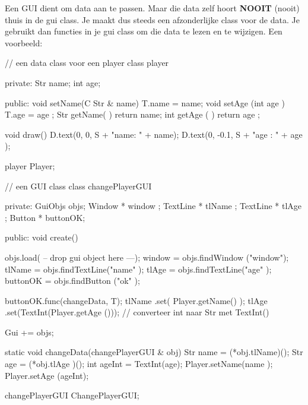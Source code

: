 Een GUI dient om data aan te passen. Maar die data zelf hoort \textbf{NOOIT} (nooit) thuis in de gui class. Je maakt dus steeds een afzonderlijke class voor de data. Je gebruikt dan functies in je gui class om die data te lezen en te wijzigen. Een voorbeeld:

\begin{code}
// een data class voor een player
class player {
private:
   Str name;
	 int age;

public:
   void setName(C Str & name) { T.name = name; }
	 void setAge (int     age ) { T.age  = age ; }
	 Str  getName(            ) { return   name; }
	 int  getAge (            ) { return   age ; }
	
	 void draw() {
	    D.text(0,    0, S + "name: " + name);
			D.text(0, -0.1, S + "age : " + age );
	 }
}
player Player;
\end{code}

\begin{code}
// een GUI class
class changePlayerGUI {
private:
   GuiObjs objs;
	 Window   * window  ;
	 TextLine * tlName  ;
	 TextLine * tlAge   ;
	 Button   * buttonOK;
	
public:
   void create() {
	    objs.load( -- drop gui object here ---);
			window   = objs.findWindow  ("window");
			tlName   = objs.findTextLine("name"  );
			tlAge    = objs.findTextLine("age"   );
			buttonOK = objs.findButton  ("ok"    );
			
			buttonOK.func(changeData, T);
			tlName  .set(        Player.getName() );
			tlAge   .set(TextInt(Player.getAge ())); // converteer int naar Str met TextInt()
			
			Gui += objs;
   }
	
	 static void changeData(changePlayerGUI & obj) {
	    Str name = (*obj.tlName)();
	 	  Str age  = (*obj.tlAge )();
	 	  int ageInt = TextInt(age);
	 	  Player.setName(name  );
	 	  Player.setAge (ageInt);
   }
}

changePlayerGUI ChangePlayerGUI;
\end{code}
